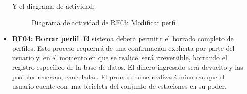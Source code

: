 \begin{itemize}
	Y el diagrama de actividad:
	\begin{figure}[!htb]
		\centering
		\caption{Diagrama de actividad de RF03: Modificar perfil}
		\label{fig:diagramaActividad_RF03}
	\end{figure}
	
	\FloatBarrier
	\item \textbf{RF04: Borrar perfil}. El sistema deberá permitir el borrado completo de perfiles. Este proceso requerirá de una confirmación explícita por parte del usuario y, en el momento en que se realice, será irreversible, borrando el registro específico de la base de datos. El dinero ingresado será devuelto y las posibles reservas, canceladas. El proceso no se realizará mientras que el usuario cuente con una bicicleta del conjunto de estaciones en su poder.
	

\end{itemize}
